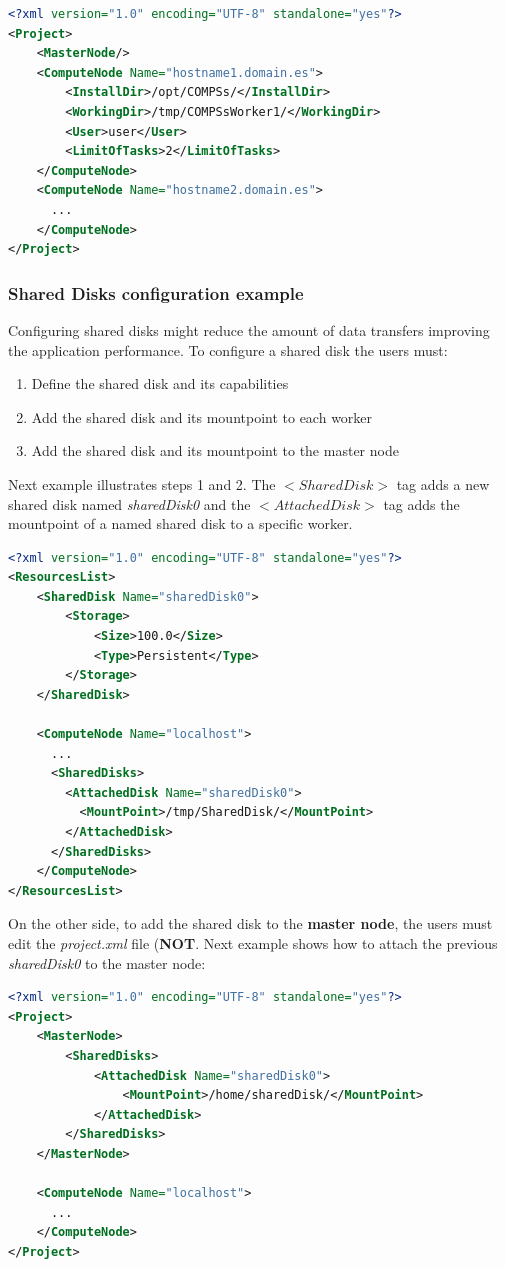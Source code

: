 \begin{lstlisting}[language=xml]
<?xml version="1.0" encoding="UTF-8" standalone="yes"?>                                                                                                                                                            
<Project>
    <MasterNode/>
    <ComputeNode Name="hostname1.domain.es">
        <InstallDir>/opt/COMPSs/</InstallDir>
        <WorkingDir>/tmp/COMPSsWorker1/</WorkingDir>
        <User>user</User>
        <LimitOfTasks>2</LimitOfTasks>
    </ComputeNode>
    <ComputeNode Name="hostname2.domain.es">
      ...
    </ComputeNode>
</Project>
\end{lstlisting}


\subsubsection{Shared Disks configuration example}
Configuring shared disks might reduce the amount of data transfers improving the application performance. To configure a 
shared disk the users must:
\begin{enumerate}
 \item Define the shared disk and its capabilities
 \item Add the shared disk and its mountpoint to each worker
 \item Add the shared disk and its mountpoint to the master node
\end{enumerate}

Next example illustrates steps 1 and 2. The $<SharedDisk>$ tag adds a new shared disk named \textit{sharedDisk0} and the
$<AttachedDisk>$ tag adds the mountpoint of a named shared disk to a specific worker.
\begin{lstlisting}[language=xml]
<?xml version="1.0" encoding="UTF-8" standalone="yes"?>
<ResourcesList>
    <SharedDisk Name="sharedDisk0">
        <Storage>
            <Size>100.0</Size>
            <Type>Persistent</Type>
        </Storage>
    </SharedDisk>
    
    <ComputeNode Name="localhost">
      ...
      <SharedDisks>
        <AttachedDisk Name="sharedDisk0">
          <MountPoint>/tmp/SharedDisk/</MountPoint>
        </AttachedDisk>
      </SharedDisks>
    </ComputeNode>
</ResourcesList>
\end{lstlisting} 

On the other side, to add the shared disk to the \textbf{master node}, the users must edit the \textit{project.xml} file
(\textbf{NOT}. Next example shows how to attach the previous \textit{sharedDisk0} to the master node:
\begin{lstlisting}[language=xml]
<?xml version="1.0" encoding="UTF-8" standalone="yes"?>
<Project>
    <MasterNode>
        <SharedDisks>
            <AttachedDisk Name="sharedDisk0">
                <MountPoint>/home/sharedDisk/</MountPoint>
            </AttachedDisk>
        </SharedDisks>
    </MasterNode>
    
    <ComputeNode Name="localhost">
      ...
    </ComputeNode>
</Project>
\end{lstlisting}

